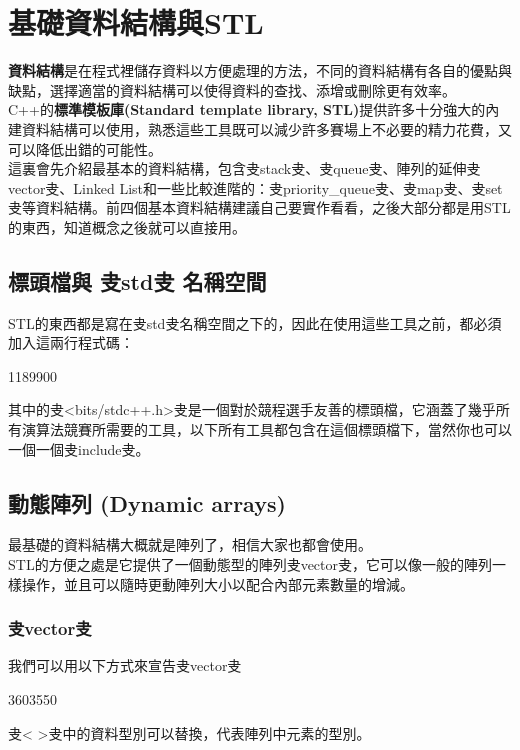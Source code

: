 \documentclass[main.tex]{subfiles}
\begin{document}
\chapter{基礎資料結構與STL}
\textbf{資料結構}是在程式裡儲存資料以方便處理的方法，不同的資料結構有各自的優點與缺點，選擇適當的資料結構可以使得資料的查找、添增或刪除更有效率。\\
\indent C++的\textbf{標準模板庫(Standard template library, STL)}提供許多十分強大的內建資料結構可以使用，熟悉這些工具既可以減少許多賽場上不必要的精力花費，又可以降低出錯的可能性。\\

這裏會先介紹最基本的資料結構，包含叏stack叏、叏queue叏、陣列的延伸叏vector叏、Linked List和一些比較進階的：叏priority\_queue叏、叏map叏、叏set叏等資料結構。前四個基本資料結構建議自己要實作看看，之後大部分都是用STL的東西，知道概念之後就可以直接用。\\


\section{標頭檔與 叏std叏 名稱空間}
STL的東西都是寫在叏std叏名稱空間之下的，因此在使用這些工具之前，都必須加入這兩行程式碼：
\begin{C++}1189900\end{C++}

\indent 其中的叏<bits/stdc++.h>叏是一個對於競程選手友善的標頭檔，它涵蓋了幾乎所有演算法競賽所需要的工具，以下所有工具都包含在這個標頭檔下，當然你也可以一個一個叏include叏。

\section{動態陣列 (Dynamic arrays)}
最基礎的資料結構大概就是陣列了，相信大家也都會使用。\\
\indent STL的方便之處是它提供了一個動態型的陣列叏vector叏，它可以像一般的陣列一樣操作，並且可以隨時更動陣列大小以配合內部元素數量的增減。

\subsection{叏vector叏}
我們可以用以下方式來宣告叏vector叏
\begin{C++}3603550\end{C++}
\indent 叏< >叏中的資料型別可以替換，代表陣列中元素的型別。\\
\end{document}
